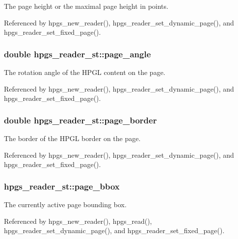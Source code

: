 The page height or the maximal page height in points. 

Referenced by hpgs\_\-new\_\-reader(), hpgs\_\-reader\_\-set\_\-dynamic\_\-page(), and hpgs\_\-reader\_\-set\_\-fixed\_\-page().
\subsubsection[page\_\-angle]{\setlength{\rightskip}{0pt plus 5cm}double {\bf hpgs\_\-reader\_\-st::page\_\-angle}}\label{structhpgs__reader__st_7b872779669ce0f0f8808383899ee0ea}


The rotation angle of the HPGL content on the page. 

Referenced by hpgs\_\-new\_\-reader(), hpgs\_\-reader\_\-set\_\-dynamic\_\-page(), and hpgs\_\-reader\_\-set\_\-fixed\_\-page().
\subsubsection[page\_\-border]{\setlength{\rightskip}{0pt plus 5cm}double {\bf hpgs\_\-reader\_\-st::page\_\-border}}\label{structhpgs__reader__st_1c27af742da3c6b23a667d5adf8ccbc8}


The border of the HPGL border on the page. 

Referenced by hpgs\_\-new\_\-reader(), hpgs\_\-reader\_\-set\_\-dynamic\_\-page(), and hpgs\_\-reader\_\-set\_\-fixed\_\-page().
\subsubsection[page\_\-bbox]{ {\bf hpgs\_\-reader\_\-st::page\_\-bbox}}\label{structhpgs__reader__st_36a681f5552fb748728a6e181b5935fe}


The currently active page bounding box. 

Referenced by hpgs\_\-new\_\-reader(), hpgs\_\-read(), hpgs\_\-reader\_\-set\_\-dynamic\_\-page(), and hpgs\_\-reader\_\-set\_\-fixed\_\-page().
